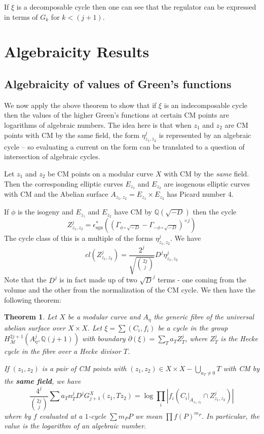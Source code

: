 \documentclass[11pt,a4paper]{article}
\newtheorem{thm}[defn]{Theorem}
\newcommand {\Q}{{\mathds Q}}
\newcommand {\M}{{\mathcal M}}
\def\sgn{\operatorname{sgn}}
\newcommand {\es}{{\epsilon^*_{\sgn}}}
\begin{document}
If $\xi$ is a decomposable cycle then one can see that the regulator can be expressed in terms of $G_k$ for $k<(j+1)$. 

\section{Algebraicity Results}

\subsection{Algebraicity of values of Green's functions}

We now apply the above theorem  to show that if $\xi$ is an indecomposable cycle then the values of the higher Green's functions at certain CM points are logarithms of algebraic numbers. 
The idea here is that when $z_1$ and $z_2$ are CM points with CM by the same field,  the form $\eta^j_{z_1,z_2}$ is represented by an algebraic cycle -- so evaluating a current on the form can be translated to a question of intersection of algebraic cycles.

Let $z_1$ and $z_2$ be CM points on a modular curve $X$ with CM by the {\em same} field. Then the corresponding elliptic curves $E_{z_1}$ and $E_{z_2}$ are isogenous elliptic curves with CM and the Abelian surface $A_{z_1,z_2}=E_{z_1} \times E_{z_2}$ has Picard number $4$. 


If $\phi$ is the isogeny and $E_{z_z}$ and $E_{z_2}$ have CM by $\Q(\sqrt{-D})$ then the cycle 
%
$$Z^j_{z_1,z_2}=\es \left( \left( \Gamma_{\phi \circ \sqrt{-D}} - \Gamma_{-\phi \circ \sqrt{-D}} \right)^{\times j}\right)$$
%
The cycle class of this is a multiple of the forms $\eta^j_{z_1,z_2}$. We have 
%
$$cl(Z^j_{z_1,z_2})= \frac{2^j}{\sqrt{\binom{2j}{j}}} D^j
\eta^j_{z_1,z_2}$$
%
Note that the $D^j$ is in fact made up of two $\sqrt{D}^{j}$ terms - one coming from the volume and the other from the normalization of the CM cycle. We then have the following theorem:


\begin{thm}
	Let $X$ be a modular curve and $A_{\eta}$ the generic fibre of the universal abelian surface over $X \times X$. Let $\xi=\sum(C_i,f_i)$ be a cycle in the group $H^{2j+1}_{\M}(A^j_{\eta},\Q(j+1))$ with boundary $\partial(\xi)=\sum_{T} a_{T} Z^j_{T}$, where $Z^j_{T}$ is the Hecke cycle in the fibre over a  Hecke divisor  $T$. 
	
	If $(z_1,z_2)$ is a pair of  CM points with $(z_1,z_2) \in X \times X - \bigcup_{a_T \neq 0} T$ with CM by the {\bf same field}, we have
	$$\frac{4^j}{\binom{2j}{j}} \sum a_T n_T^j D^j G_ {j+1}^X(z_1,T z_2)=  \log \prod_i  \left| f_i(C_i|_{A_{z_1,z_2}} \cap Z^j_{z_1,z_2})\right|$$
	where by $f$ evaluated at a $1$-cycle $\sum m_P P$ we mean $\prod f(P)^{m_P}$. 
	In particular, the value is the logarithm of an algebraic number. 
	\label{algebraicity}
\end{thm}
\end{document}
